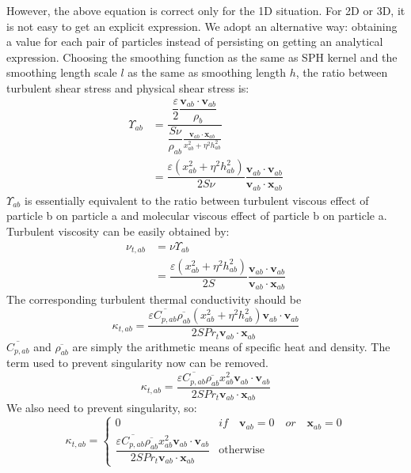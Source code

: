 \documentclass[journal abbreviation, manuscript]{copernicus}
\begin{document}
However, the above equation is correct only for the 1D situation. For 2D or 3D, it is not easy to get an explicit expression. 
We adopt an alternative way: obtaining a value for each pair of particles instead of persisting on getting an analytical expression. Choosing the smoothing function as the same as SPH kernel and the smoothing length scale $l$ as the same as smoothing length $h$, the ratio between turbulent shear stress and physical shear stress is: 
\begin{equation}
\begin{split}
\Upsilon_{ab} &= \dfrac{\dfrac{\varepsilon}{2} \dfrac{\textbf{v}_{ab} \cdot \textbf{v}_{ab}}{\rho_b}}{\dfrac{S \nu}{\rho_{ab}} \frac{\textbf{v}_{ab} \cdot \textbf{x}_{ab}}{x_{ab}^2 + \eta^2 h_{ab}^2}} \\
 & = \dfrac{\varepsilon \left(x_{ab}^2 + \eta^2 h_{ab}^2\right)}{2 S \nu} \dfrac{\textbf{v}_{ab} \cdot \textbf{v}_{ab}}{\textbf{v}_{ab} \cdot \textbf{x}_{ab}}
\end{split}
\end{equation}
$\Upsilon_{ab}$ is essentially equivalent to the ratio between turbulent viscous effect of particle b on particle a and molecular viscous effect of particle b on particle a. Turbulent viscosity can be easily obtained by:
\begin{equation}
\begin{split}
\nu_{t,ab} &= \nu \Upsilon_{ab} \\
&= \dfrac{\varepsilon \left(x_{ab}^2 + \eta^2 h_{ab}^2\right)}{2 S} \dfrac{\textbf{v}_{ab} \cdot \textbf{v}_{ab}}{\textbf{v}_{ab} \cdot \textbf{x}_{ab}}
\end{split}
\end{equation}
The corresponding turbulent thermal conductivity should be
\begin{equation}
\kappa_{t,ab}=\dfrac{\varepsilon \overline{C_{p,ab}} \overline{\rho_{ab}} \left(x_{ab}^2 + \eta^2 h_{ab}^2\right) \textbf{v}_{ab} \cdot \textbf{v}_{ab}}{2 S Pr_t\textbf{v}_{ab} \cdot \textbf{x}_{ab}}
\end{equation}
$\overline{C_{p,ab}}$ and $\overline{\rho_{ab}}$ are simply the arithmetic means of specific heat and density. The term used to prevent singularity now can be removed. 
\begin{equation}
\kappa_{t,ab}=\dfrac{\varepsilon \overline{C_{p,ab}} \overline{\rho_{ab}} x_{ab}^2 \textbf{v}_{ab} \cdot \textbf{v}_{ab}}{2 S Pr_t\textbf{v}_{ab} \cdot \textbf{x}_{ab} }
\end{equation}
We also need to prevent singularity, so: 
\begin{equation}
\kappa_{t,ab}= 
\begin{cases} 
      0 & if  \quad \textbf{v}_{ab}=0 \quad or \quad \textbf{x}_{ab}=0 \\
      \dfrac{\varepsilon \overline{C_{p,ab}} \overline{\rho_{ab}} x_{ab}^2 \textbf{v}_{ab} \cdot \textbf{v}_{ab}}{2 S Pr_t\textbf{v}_{ab} \cdot \textbf{x}_{ab} } & \text{otherwise}
\end{cases}
\label{eq:SPH-LANS-heat-conductivity}
\end{equation}
\end{document}

